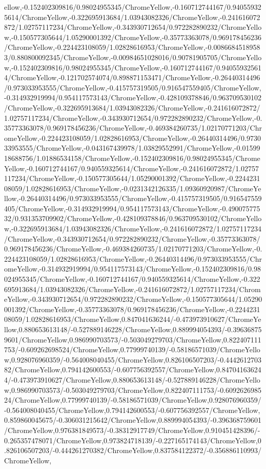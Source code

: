 {\begin{tikzternal}
{ellow,-0.152402309816/0.98024955345/ChromeYellow,-0.160712744167/0.940559325614/ChromeYellow,-0.322695913684/1.03943082326/ChromeYellow,-0.241616072872/1.02757117234/ChromeYellow,-0.343930712654/0.972282890232/ChromeYellow,-0.150577305644/1.05290001392/ChromeYellow,-0.35773363078/0.969178456236/ChromeYellow,-0.224423108059/1.02828616953/ChromeYellow,-0.00866845189583/0.880800092345/ChromeYellow,-0.00984651028016/0.90781905705/ChromeYellow,-0.152402309816/0.98024955345/ChromeYellow,-0.160712744167/0.940559325614/ChromeYellow,-0.121702574074/0.898871153471/ChromeYellow,-0.26440314496/0.973033953555/ChromeYellow,-0.415757319505/0.916547559405/ChromeYellow,-0.314932919994/0.954117573143/ChromeYellow,-0.428109378846/0.963709530102/ChromeYellow,-0.322695913684/1.03943082326/ChromeYellow,-0.241616072872/1.02757117234/ChromeYellow,-0.343930712654/0.972282890232/ChromeYellow,-0.35773363078/0.969178456236/ChromeYellow,-0.469384260735/1.02170771203/ChromeYellow,-0.224423108059/1.02828616953/ChromeYellow,-0.26440314496/0.973033953555/ChromeYellow,-0.043167439978/1.03829552991/ChromeYellow,-0.0159918688756/1.01886534158/ChromeYellow,-0.152402309816/0.98024955345/ChromeYellow,-0.160712744167/0.940559325614/ChromeYellow,-0.241616072872/1.02757117234/ChromeYellow,-0.150577305644/1.05290001392/ChromeYellow,-0.224423108059/1.02828616953/ChromeYellow,-0.0231342126335/1.09360920987/ChromeYellow,-0.26440314496/0.973033953555/ChromeYellow,-0.415757319505/0.916547559405/ChromeYellow,-0.314932919994/0.954117573143/ChromeYellow,-0.49007577532/0.931353709902/ChromeYellow,-0.428109378846/0.963709530102/ChromeYellow,-0.322695913684/1.03943082326/ChromeYellow,-0.241616072872/1.02757117234/ChromeYellow,-0.343930712654/0.972282890232/ChromeYellow,-0.35773363078/0.969178456236/ChromeYellow,-0.469384260735/1.02170771203/ChromeYellow,-0.224423108059/1.02828616953/ChromeYellow,-0.26440314496/0.973033953555/ChromeYellow,-0.314932919994/0.954117573143/ChromeYellow,-0.152402309816/0.98024955345/ChromeYellow,-0.160712744167/0.940559325614/ChromeYellow,-0.322695913684/1.03943082326/ChromeYellow,-0.241616072872/1.02757117234/ChromeYellow,-0.343930712654/0.972282890232/ChromeYellow,-0.150577305644/1.05290001392/ChromeYellow,-0.35773363078/0.969178456236/ChromeYellow,-0.224423108059/1.02828616953/ChromeYellow,0.847041636244/-0.473973910627/ChromeYellow,0.880653613148/-0.527889146228/ChromeYellow,0.889994054393/-0.396368759601/ChromeYellow,0.986990703573/-0.503049279703/ChromeYellow,0.822407111753/-0.609262698524/ChromeYellow,0.77999740139/-0.58186571039/ChromeYellow,0.928076960359/-0.564008040455/ChromeYellow,0.826106507203/-0.444261270382/ChromeYellow,0.794142600553/-0.607756392557/ChromeYellow,0.847041636244/-0.473973910627/ChromeYellow,0.880653613148/-0.527889146228/ChromeYellow,0.986990703573/-0.503049279703/ChromeYellow,0.822407111753/-0.609262698524/ChromeYellow,0.77999740139/-0.58186571039/ChromeYellow,0.928076960359/-0.564008040455/ChromeYellow,0.794142600553/-0.607756392557/ChromeYellow,0.859860045675/-0.306031215642/ChromeYellow,0.889994054393/-0.396368759601/ChromeYellow,0.976381849573/-0.38312917749/ChromeYellow,0.910451428396/-0.265357478071/ChromeYellow,0.973824718139/-0.227165174143/ChromeYellow,0.826106507203/-0.444261270382/ChromeYellow,0.837584122372/-0.356886110993/ChromeYellow,}
\end{tikzternal}}
